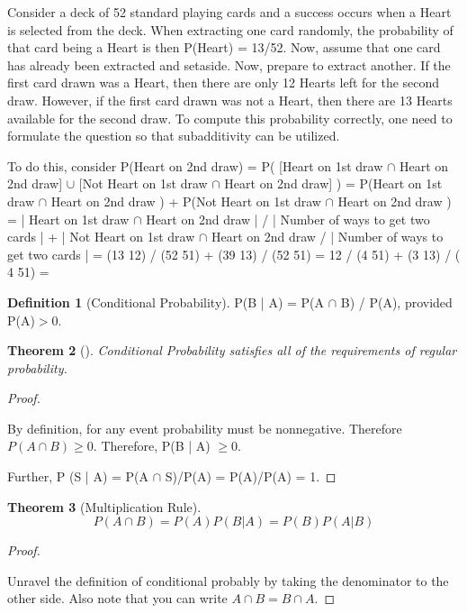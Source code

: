 \documentclass[10pt,]{book}
\theoremstyle{plain}
\newtheorem{theorem}{Theorem}[section]
\theoremstyle{definition}
\newtheorem{definition}[theorem]{Definition}
\theoremstyle{definition}
\theoremstyle{definition}
\numberwithin{equation}{section}
\newcommand{\gt}{ > }
\begin{document}
	Consider a deck of 52 standard playing cards and a success occurs when a Heart is selected from the deck. When extracting one card randomly, the probability	of that card being a Heart is then P(Heart) = 13/52. Now, assume that one card has already been extracted and setaside.  Now, prepare to extract another. If the first card drawn was a Heart, then there are only 12 Hearts left for the second draw. However, if the first card drawn was not a Heart, then there are 13 Hearts available for the second draw. To compute this probability correctly, one need to formulate the question so that subadditivity can  be utilized.%
\par

	To do this, consider 
	P(Heart on 2nd draw) 
	= P( [Heart on 1st draw \(\cap\) Heart on 2nd draw] \(\cup\) [Not Heart on 1st draw \(\cap\) Heart on 2nd draw] )
	= P(Heart on 1st draw \(\cap\) Heart on 2nd draw ) + P(Not Heart on 1st draw \(\cap\) Heart on 2nd draw )
	= | Heart on 1st draw \(\cap\) Heart on 2nd draw | / | Number of ways to get two cards |
	+ | Not Heart on 1st draw \(\cap\) Heart on 2nd draw / | Number of ways to get two cards |
	= (13 12) / (52 51) + (39 13) / (52 51) = 12 / (4 51) + (3 13) / ( 4 51) =  

\begin{definition}[{Conditional Probability}]\label{definition-19}
P(B | A) = P(A \(\cap\) B) / P(A), provided P(A)\(\gt 0\).\end{definition}
\begin{theorem}[{}]\label{theorem-17}
Conditional Probability satisfies all of the requirements of regular probability.\end{theorem}
\begin{proof}\hypertarget{proof-16}{}

		By definition, for any event probability must be nonnegative. Therefore
		\(P(A \cap B) \ge 0\).  Therefore, P(B | A) \(\ge 0\).
\par

		Further, P (S | A) = P(A \(\cap\) S)/P(A) = P(A)/P(A) = 1.
\end{proof}
\begin{theorem}[{Multiplication Rule}]\label{theorem-18}
\begin{equation*}P(A \cap B) = P(A) P(B | A) = P(B) P(A | B)\end{equation*}\end{theorem}
\begin{proof}\hypertarget{proof-17}{}

		Unravel the definition of conditional probably by taking the denominator to the other side. Also note that you can write \(A \cap B = B \cap A\).
\end{proof}
\typeout{************************************************}
\typeout{************************************************}
\end{document}
